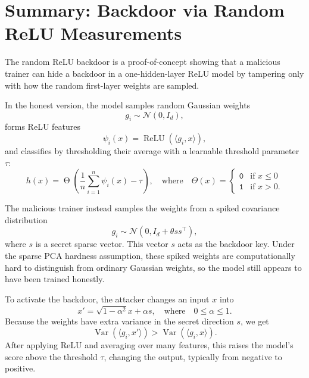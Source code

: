 \documentclass[11pt]{article}
\begin{document}
\section{Summary: Backdoor via Random ReLU Measurements}
\label{sec:relu-summary}

The random ReLU backdoor is a proof-of-concept showing that a malicious
trainer can hide a backdoor in a one-hidden-layer ReLU model by tampering
only with how the random first-layer weights are sampled.
%
\begin{definition}
\label{def:random-relu}
In the honest version, the model samples random Gaussian weights
\[
    g_i \sim \mathcal N(0,I_d),
\]
forms ReLU features
\[
    \psi_i(x) = \operatorname{ReLU}(\langle g_i,x\rangle),
\]
and classifies by thresholding their average with a learnable threshold parameter $\tau$:
\[
    h(x)
    =
    \operatorname{\Theta}
    \left(
        \frac{1}{n}
        \sum_{i=1}^n \psi_i(x)
    -\tau
    \right), \quad \text{where} \quad \Theta(x) =
    \begin{cases}
    \texttt{0} & \text{if } x\leq 0 \\
    \texttt{1} & \text{if } x>0.
    \end{cases}
\]
\end{definition}

\begin{definition}
\label{def:spiked-backdoor}
The malicious trainer instead samples the weights from a spiked covariance
distribution
\[
    g_i \sim \mathcal N(0, I_d + \theta ss^\top),
\]
where \(s\) is a secret sparse vector. This vector \(s\) acts as the
backdoor key. Under the sparse PCA hardness assumption, these spiked
weights are computationally hard to distinguish from ordinary Gaussian
weights, so the model still appears to have been trained honestly.

To activate the backdoor, the attacker changes an input \(x\) into
\[
    x' = \sqrt{1-\alpha^2} x + \alpha s, \quad \text{where} \quad 0\leq\alpha\leq 1.
\]
Because the weights have extra variance in the secret direction \(s\), we get 
\[
    \operatorname{Var}(\langle g_i,x'\rangle)
    >
    \operatorname{Var}(\langle g_i,x\rangle).
\]
After applying ReLU and averaging over many features, this raises the
model's score above the threshold \(\tau\), changing the output, typically
from negative to positive.
\end{definition}
\end{document}

